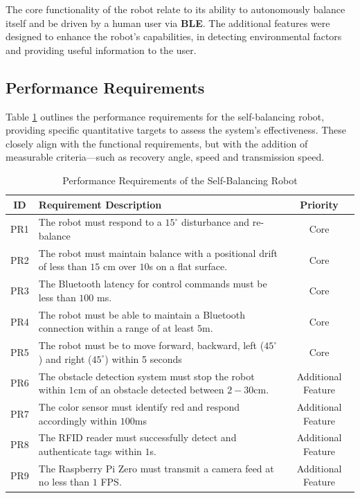 \documentclass{article}
\begin{document}
The core functionality of the robot relate to its ability to autonomously balance itself and be driven
by a human user via \textbf{BLE}. The additional features were designed to enhance the robot's capabilities, in detecting environmental factors and
providing useful information to the user.

\subsection{Performance Requirements}
Table \ref{tab:performance_requirements} outlines the performance requirements for the self-balancing robot, providing specific quantitative targets to assess the system's effectiveness.
These closely align with the functional requirements, but with the addition of measurable criteria—such as recovery angle, speed and transmission speed.

\begin{table}[H]
    \centering
    \renewcommand{\arraystretch}{1.3} %
    \begin{tabularx}{\textwidth}{|c|X|c|}
        \hline
        \textbf{ID} & \textbf{Requirement Description} & \textbf{Priority} \\
        \hline
        PR1 & The robot must respond to a $15 ^\circ$  disturbance and re-balance & Core \\
        \hline
        PR2 & The robot must maintain balance with a positional drift of less than $15$ cm over $10$s on a flat surface. & Core \\
        \hline
        PR3 & The Bluetooth latency for control commands must be less than $100$ ms. & Core \\
        \hline
        PR4 & The robot must be able to maintain a Bluetooth connection within a range of at least $5$m. & Core \\
        \hline
        PR5 & The robot must be to move forward, backward, left ($45^\circ$) and right ($45^\circ$) within 5 seconds & Core \\
        \hline
        PR6 & The obstacle detection system must stop the robot within $1$cm of an obstacle detected between $2-30$cm. & Additional Feature \\
        \hline
        PR7 & The color sensor must identify red and respond accordingly within $100$ms & Additional Feature \\
        \hline
        PR8 & The RFID reader must successfully detect and authenticate tags within $1$s. & Additional Feature \\
        \hline
        PR9 & The Raspberry Pi Zero must transmit a camera feed at no less than $1$ FPS. & Additional Feature \\
        \hline
    \end{tabularx}
    \caption{Performance Requirements of the Self-Balancing Robot}
    \label{tab:performance_requirements}
\end{table}
\end{document}
